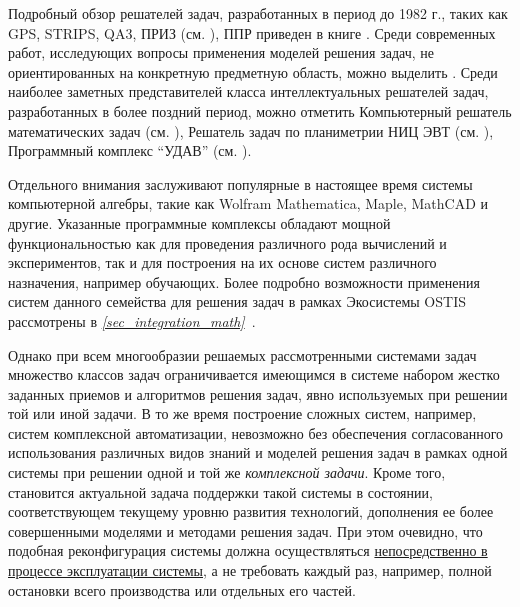 Подробный обзор решателей задач, разработанных в период до 1982 г., таких как GPS, STRIPS, QA3, ПРИЗ (см. ), ППР приведен в книге . Среди современных работ, исследующих вопросы применения моделей решения задач, не ориентированных на конкретную предметную область, можно выделить . Среди наиболее заметных представителей класса интеллектуальных решателей задач, разработанных в более поздний период, можно отметить Компьютерный решатель математических задач (см. ), Решатель задач по планиметрии НИЦ ЭВТ (см. ), Программный комплекс ``УДАВ'' (см. ). 

Отдельного внимания заслуживают популярные в настоящее время системы компьютерной алгебры, такие как Wolfram Mathematica, Maple, MathCAD и другие. Указанные программные комплексы обладают мощной функциональностью как для проведения различного рода вычислений и экспериментов, так и для построения на их основе систем различного назначения, например обучающих. Более подробно возможности применения систем данного семейства для решения задач в рамках Экосистемы OSTIS рассмотрены в \textit{\ref{sec_integration_math}~}.

Однако при всем многообразии решаемых рассмотренными системами задач множество классов задач ограничивается имеющимся в системе набором жестко заданных приемов и алгоритмов решения задач, явно используемых при решении той или иной задачи. В то же время построение сложных систем, например, систем комплексной автоматизации, невозможно без обеспечения согласованного использования различных видов знаний и моделей решения задач в рамках одной системы при решении одной и той же \textit{комплексной задачи}. Кроме того, становится актуальной задача поддержки такой системы в состоянии, соответствующем текущему уровню развития технологий, дополнения ее более совершенными моделями и методами решения задач. При этом очевидно, что подобная реконфигурация системы должна осуществляться \underline{непосредственно в процессе эксплуатации системы}, а не требовать каждый раз, например, полной остановки всего производства или отдельных его частей.

